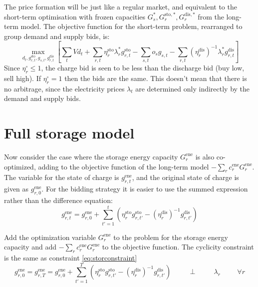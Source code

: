 \documentclass[final,3p,times]{elsarticle}
\def\l{\lambda}
\begin{document}
The price formation will be just like a regular market, and equivalent to the short-term optimisation with frozen capacities $G^*_s,G^{\textrm{sto},*}_{r},G^{\textrm{dis},*}_{r}$ from the long-term model. The objective function for the short-term problem, rearranged to group demand and supply bids, is:
\begin{equation}
    \max_{d_{t},g^{\textrm{sto}}_{r,t}, g_{s,t}, g^{\textrm{dis}}_{r,t}}\left[\sum_{t} Vd_{t} +  \sum_{r,t} \eta_r^{\textrm{sto}}\lambda^*_r g^{\textrm{sto}}_{r,t}   - \sum_{s,t} o_{s} g_{s,t}-\sum_{r,t} (\eta_r^{\textrm{dis}})^{-1}  \lambda^*_r g^{\textrm{dis}}_{r,t} \right]  \label{eq:objst2}
\end{equation}
Since $\eta_r^\circ \leq 1$, the charge bid is seen to be less than the discharge bid (buy low, sell high). If $\eta_r^\circ = 1$ then the bids are the same. This doesn't mean that there is no arbitrage, since the electricity prices $\l_t$ are determined only indirectly by the demand and supply bids.

\section{Full storage model}

Now consider the case where the storage energy capacity $G^{\textrm{ene}}_r$ is also co-optimized, adding to the objective function of the long-term model  $-\sum_r c^{\textrm{ene}}_r G^{\textrm{ene}}_r$. The variable for the state of charge is
$g^{\textrm{ene}}_{r,t}$, and the original state of charge is given as $g^{\textrm{ene}}_{r,0}$. For the bidding strategy it is easier to use the summed expression rather than the difference equation:
\begin{equation}
  g^{\textrm{ene}}_{r,t} = g^{\textrm{ene}}_{r,0} + \sum_{t'=1}^t \left( \eta^{\textrm{sto}}_r g^{\textrm{sto}}_{r,t'} - (\eta^{\textrm{dis}}_r)^{-1} g^{\textrm{dis}}_{r,t'} \right)
\end{equation}

Add the optimization variable $G^{\textrm{ene}}_r$ to the problem for the storage energy capacity and add $-\sum_r c^{\textrm{ene}}_r G^{\textrm{ene}}_r$ to the objective function.
The cyclicity constraint is the same as constraint \eqref{eq:storconstraint}
\begin{equation}
 g^{\textrm{ene}}_{r,0} = g^{\textrm{ene}}_{r,T} = g^{\textrm{ene}}_{r,0} + \sum_{t'=1}^T \left( \eta^{\textrm{sto}}_r g^{\textrm{sto}}_{r,t'} - (\eta^{\textrm{dis}}_r)^{-1} g^{\textrm{dis}}_{r,t'} \right)   \hspace{1cm}\perp \hspace{1cm} \lambda_{r} \hspace{1cm} \forall r
\end{equation}
\end{document}
